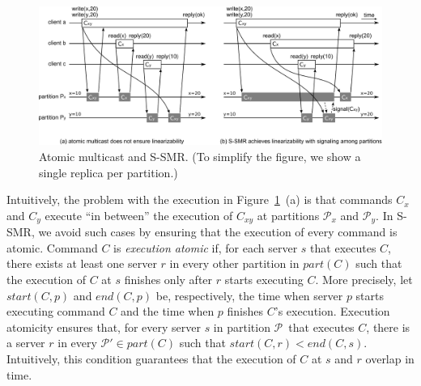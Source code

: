 \documentclass[11pt]{article}
\newcommand{\pp}{$\mathcal{P}$}
\newcommand{\ppm}{\mathcal{P}}
\begin{document}
\begin{figure}
\begin{minipage}[b]{1.0\linewidth} %
\centering
      \includegraphics[width=0.85\linewidth]{mcastssmr_nonlin_linsignal_v3}
\end{minipage}
\caption{Atomic multicast and S-SMR. (To simplify the figure, we show a single replica per partition.)}
\label{fig:mcastnonlinssmr}
\end{figure}

Intuitively, the problem with the execution in Figure~\ref{fig:mcastnonlinssmr}~(a) is that commands $C_x$ and $C_y$ execute ``in between'' the execution of $C_{xy}$ at partitions $\ppm_x$ and $\ppm_y$.
In S-SMR, we avoid such cases by ensuring that the execution of every command is atomic.
%
Command $C$ is \emph{execution atomic} if, for each server $s$ that executes $C$, there exists at least one server $r$ in every other partition in $part(C)$ such that the execution of $C$ at $s$ finishes only after $r$ starts executing $C$.
%
More precisely, let $start(C,p)$ and $end(C,p)$ be, respectively, the time when server $p$ starts executing command $C$ and the time when $p$ finishes $C$'s execution.
Execution atomicity ensures that, for every server $s$ in partition \pp\ that executes $C$, there is a server $r$ in every $\ppm' \in part(C)$ such that \mbox{$start(C,r) < end(C,s)$}.
Intuitively, this condition guarantees that the execution of $C$ at $s$ and $r$ overlap in time.

\end{document}
